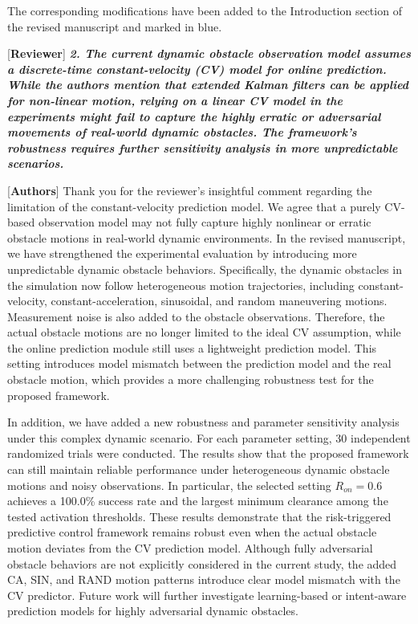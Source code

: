 \documentclass[12pt, twosides]{article}
\theoremstyle{definition}
\begin{document}
The corresponding modifications have been added to the Introduction section of the revised manuscript and marked in blue.

\medskip

\textcolor[rgb]{0.00,0.00,1.00}{[\textbf {Reviewer}]} \textit{\textbf{2. The current dynamic obstacle observation model assumes a discrete-time constant-velocity (CV) model for online prediction. While the authors mention that extended Kalman filters can be applied for non-linear motion, relying on a linear CV model in the experiments might fail to capture the highly erratic or adversarial movements of real-world dynamic obstacles. The framework's robustness requires further sensitivity analysis in more unpredictable scenarios. }}

\textcolor[rgb]{0.00,0.00,1.00}{[\textbf{Authors}]} Thank you for the reviewer's insightful comment regarding the limitation of the constant-velocity prediction model. We agree that a purely CV-based observation model may not fully capture highly nonlinear or erratic obstacle motions in real-world dynamic environments. In the revised manuscript, we have strengthened the experimental evaluation by introducing more unpredictable dynamic obstacle behaviors. Specifically, the dynamic obstacles in the simulation now follow heterogeneous motion trajectories, including constant-velocity, constant-acceleration, sinusoidal, and random maneuvering motions. Measurement noise is also added to the obstacle observations. Therefore, the actual obstacle motions are no longer limited to the ideal CV assumption, while the online prediction module still uses a lightweight prediction model. This setting introduces model mismatch between the prediction model and the real obstacle motion, which provides a more challenging robustness test for the proposed framework.

In addition, we have added a new robustness and parameter sensitivity analysis under this complex dynamic scenario. For each parameter setting, 30 independent randomized trials were conducted. The results show that the proposed framework can still maintain reliable performance under heterogeneous dynamic obstacle motions and noisy observations. In particular, the selected setting $R_{on}=0.6$ achieves a 100.0\% success rate and the largest minimum clearance among the tested activation thresholds. These results demonstrate that the risk-triggered predictive control framework remains robust even when the actual obstacle motion deviates from the CV prediction model. Although fully adversarial obstacle behaviors are not explicitly considered in the current study, the added CA, SIN, and RAND motion patterns introduce clear model mismatch with the CV predictor. Future work will further investigate learning-based or intent-aware prediction models for highly adversarial dynamic obstacles.
\end{document}
